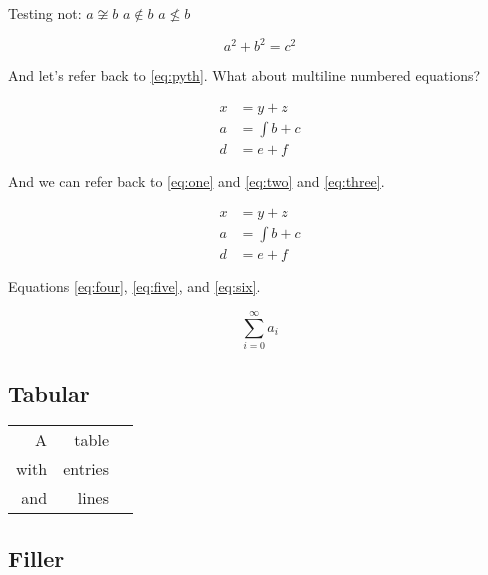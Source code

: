 \documentclass[
  text,
  xhtml,
  itex
]{internet}
\begin{document}
Testing not: \(a \not\cong b\) \(a \not\in b\) \(a \not\le b\)

\begin{equation}
\label{eq:pyth}
a^2 + b^2 = c^2
\end{equation}

And let's refer back to \ref{eq:pyth}.
What about multiline numbered equations?

\begin{align}
\label{eq:one}
x &= y + z \\
\label{eq:two}
a &= \int b + c \\
\label{eq:three}
d &= e + f
\end{align}

And we can refer back to \ref{eq:one} and \ref{eq:two} and \ref{eq:three}.

\begin{align}
\label{eq:four}
x &= y + z \\
\nonumber
\label{eq:five}
a &= \int b + c \\
\label{eq:six}
d &= e + f
\end{align}

Equations \ref{eq:four}, \ref{eq:five}, and \ref{eq:six}.

\begin{equation}
\sum_{i = 0}^\infty a_i
\end{equation}

\subsection{Tabular}

\begin{tabular}{rrr}
A & table \\
with & entries \\ \hline
and & lines
\end{tabular}

\subsection{Filler}

\lipsum
\end{document}
